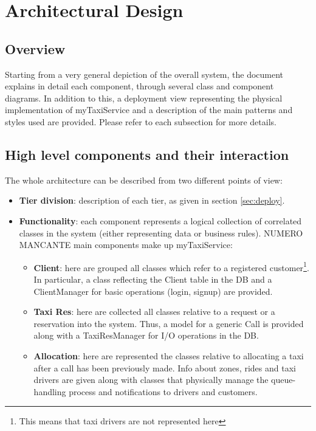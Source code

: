 \pagebreak
\section{Architectural Design}
 
\subsection{Overview}
Starting from a very general depiction of the overall system, the document explains in detail each component, through several class and component diagrams. In addition to this, a deployment view representing the physical implementation of myTaxiService and a description of the main patterns and styles used are provided. Please refer to each subsection for more details.

\subsection{High level components and their interaction}
The whole architecture can be described from two different points of view: 
\begin{itemize}
	\item \textbf{Tier division}: description of each tier, as given in section \ref{sec:deploy}.
	\item \textbf{Functionality}: each component represents a logical collection of correlated classes in the system (either representing data or business rules). NUMERO MANCANTE main components make up myTaxiService:
	\begin{itemize}
		\item \textbf{Client}: here are grouped all classes which refer to a registered customer\footnote{This means that taxi drivers are not represented here}. In particular, a class reflecting the Client table in the DB and a ClientManager for basic operations (login, signup) are provided.
		\newpage
		\item \textbf{Taxi Res}: here are collected all classes relative to a request or a reservation into the system. Thus, a model for a generic Call is provided along with a TaxiResManager for I/O operations in the DB.
		\newpage
		\item \textbf{Allocation}: here are represented the classes relative to allocating a taxi after a call has been previously made. Info about zones, rides and taxi drivers are given along with classes that physically manage the queue-handling process and notifications to drivers and customers.
		\newpage
	\end{itemize}
	
\end{itemize}


